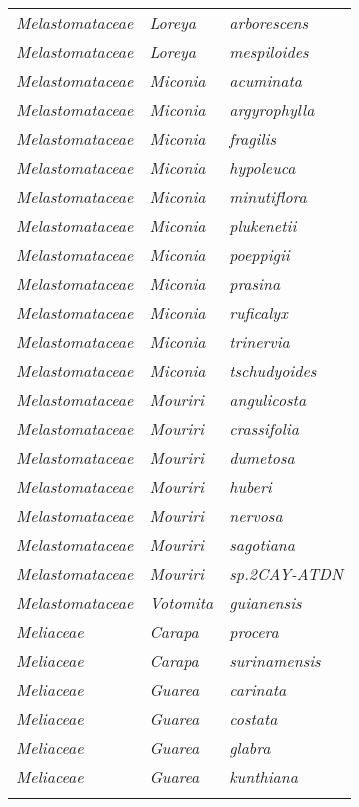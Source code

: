 \documentclass[fleqn,10pt]{ArtEcoFoG} %
\renewenvironment{table}{\begin{table*}}{\end{table*}\ignorespacesafterend}
\begin{document}
\begin{table}
\begin{tabular}[t]{lll}
\em{Melastomataceae} & \em{Loreya} & \em{arborescens}\\
\em{Melastomataceae} & \em{Loreya} & \em{mespiloides}\\
\addlinespace
\em{Melastomataceae} & \em{Miconia} & \em{acuminata}\\
\em{Melastomataceae} & \em{Miconia} & \em{argyrophylla}\\
\em{Melastomataceae} & \em{Miconia} & \em{fragilis}\\
\em{Melastomataceae} & \em{Miconia} & \em{hypoleuca}\\
\em{Melastomataceae} & \em{Miconia} & \em{minutiflora}\\
\addlinespace
\em{Melastomataceae} & \em{Miconia} & \em{plukenetii}\\
\em{Melastomataceae} & \em{Miconia} & \em{poeppigii}\\
\em{Melastomataceae} & \em{Miconia} & \em{prasina}\\
\em{Melastomataceae} & \em{Miconia} & \em{ruficalyx}\\
\em{Melastomataceae} & \em{Miconia} & \em{trinervia}\\
\addlinespace
\em{Melastomataceae} & \em{Miconia} & \em{tschudyoides}\\
\em{Melastomataceae} & \em{Mouriri} & \em{angulicosta}\\
\em{Melastomataceae} & \em{Mouriri} & \em{crassifolia}\\
\em{Melastomataceae} & \em{Mouriri} & \em{dumetosa}\\
\em{Melastomataceae} & \em{Mouriri} & \em{huberi}\\
\addlinespace
\em{Melastomataceae} & \em{Mouriri} & \em{nervosa}\\
\em{Melastomataceae} & \em{Mouriri} & \em{sagotiana}\\
\em{Melastomataceae} & \em{Mouriri} & \em{sp.2CAY-ATDN}\\
\em{Melastomataceae} & \em{Votomita} & \em{guianensis}\\
\em{Meliaceae} & \em{Carapa} & \em{procera}\\
\addlinespace
\em{Meliaceae} & \em{Carapa} & \em{surinamensis}\\
\em{Meliaceae} & \em{Guarea} & \em{carinata}\\
\em{Meliaceae} & \em{Guarea} & \em{costata}\\
\em{Meliaceae} & \em{Guarea} & \em{glabra}\\
\em{Meliaceae} & \em{Guarea} & \em{kunthiana}\\
\addlinespace

\end{tabular}
\end{table}
\end{document}
